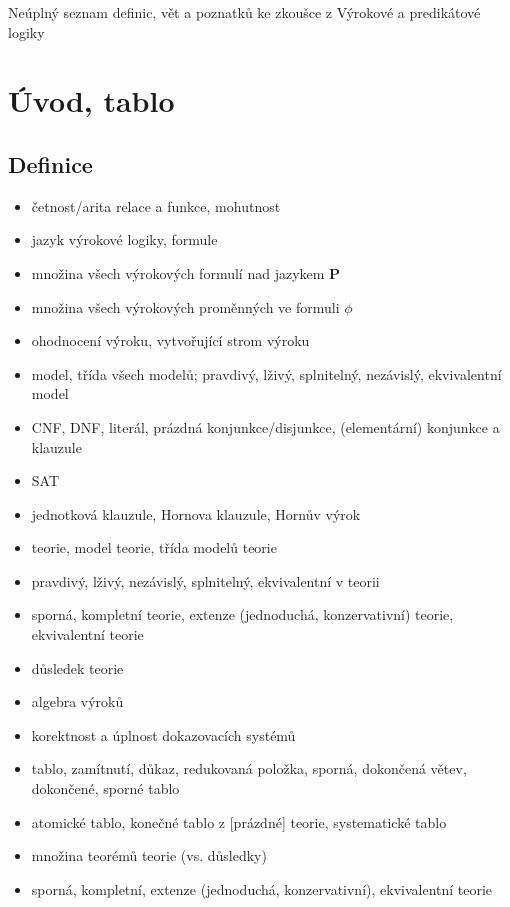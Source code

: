 \documentclass[a4paper]{article}
\begin{document}
\thispagestyle{fancy} %
{}

Neúplný seznam definic, vět a poznatků ke zkoušce z Výrokové a predikátové logiky

\newcommand{\bP}{$\mathbf{P}$}
\newcommand{\ph}{$\phi$}

\section{Úvod, tablo}

\subsection{Definice}
\begin{itemize}
\item četnost/arita relace a funkce, mohutnost
\item jazyk výrokové logiky, formule
\item množina všech výrokových formulí nad jazykem \bP
\item množina všech výrokových proměnných ve formuli \ph
\item ohodnocení výroku, vytvořující strom výroku
\item model, třída všech modelů; pravdivý, lživý, splnitelný, nezávislý, ekvivalentní model
\item CNF, DNF, literál, prázdná konjunkce/disjunkce, (elementární) konjunkce a klauzule
\item SAT
\item jednotková klauzule, Hornova klauzule, Hornův výrok
\item teorie, model teorie, třída modelů teorie
\item pravdivý, lživý, nezávislý, splnitelný, ekvivalentní v teorii
\item sporná, kompletní teorie, extenze (jednoduchá, konzervativní) teorie, ekvivalentní teorie
\item důsledek teorie
\item algebra výroků
\item korektnost a úplnost dokazovacích systémů
\item tablo, zamítnutí, důkaz, redukovaná položka, sporná, dokončená větev, dokončené, sporné tablo
\item atomické tablo, konečné tablo z [prázdné] teorie, systematické tablo
\item množina teorémů teorie (vs. důsledky)
\item sporná, kompletní, extenze (jednoduchá, konzervativní), ekvivalentní teorie
\end{itemize}
\end{document}
